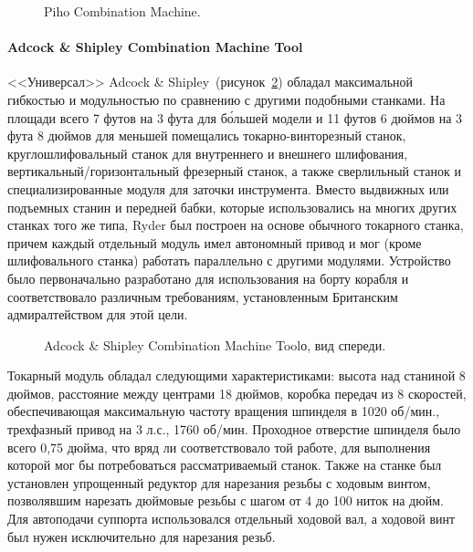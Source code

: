 \begin{figure}[ht]
	\caption{Piho Combination Machine.}\label{fig:piho}
\end{figure}

\paragraph{Adcock \& Shipley Combination Machine Tool}

<<Универсал>> Adcock \& Shipley~(рисунок~\cref{fig:adcock-1}) обладал максимальной гибкостью и модульностью по сравнению с другими подобными станками. На площади всего 7 футов на 3 фута для б\'ольшей модели и 11 футов 6 дюймов на 3 фута 8 дюймов для меньшей помещались токарно-винторезный станок, круглошлифовальный станок для внутреннего и внешнего шлифования, вертикальный/горизонтальный фрезерный станок, а также сверлильный станок и специализированные модуля для заточки инструмента. Вместо выдвижных или подъемных станин и передней бабки, которые использовались на многих других станках того же типа, Ryder был построен на основе обычного токарного станка, причем каждый отдельный модуль имел автономный привод и мог (кроме шлифовального станка) работать параллельно с другими модулями. Устройство было первоначально разработано для использования на борту корабля и соответствовало различным требованиям, установленным Британским адмиралтейством для этой цели. 

\begin{figure}[ht]
	\caption{Adcock \& Shipley Combination Machine Toolо, вид спереди.}\label{fig:adcock-1}
\end{figure}

Токарный модуль обладал следующими характеристиками: высота над станиной 8 дюймов, расстояние между центрами 18 дюймов, коробка передач из 8 скоростей, обеспечивающая максимальную частоту вращения шпинделя в 1020 об/мин., трехфазный привод на 3 л.с., 1760 об/мин. Проходное отверстие шпинделя было всего 0,75 дюйма, что вряд ли соответствовало той работе, для выполнения которой мог бы потребоваться рассматриваемый станок. Также на станке был установлен упрощенный редуктор для нарезания резьбы с ходовым винтом, позволявшим нарезать дюймовые резьбы с шагом от 4 до 100 ниток на дюйм. Для автоподачи суппорта использовался отдельный ходовой вал, а ходовой винт был нужен исключительно для нарезания резьб.

